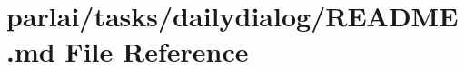 \hypertarget{parlai_2tasks_2dailydialog_2README_8md}{}\section{parlai/tasks/dailydialog/\+R\+E\+A\+D\+ME.md File Reference}
\label{parlai_2tasks_2dailydialog_2README_8md}
